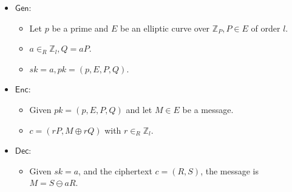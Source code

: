 \documentclass[11pt]{article}
\theoremstyle{definition}
\theoremstyle{proof}
\newcommand{\Gen}{\mathsf{Gen}}
\newcommand{\Enc}{\mathsf{Enc}}
\newcommand{\Dec}{\mathsf{Dec}}
\begin{document}
\begin{itemize}
	\item $\Gen$:
	\begin{itemize}
		\item Let $p$ be a prime and $E$ be an elliptic curve over $\mathbb{Z}_P, P \in E$ of order $l$.
		\item $a \in_R \mathbb{Z}_l, Q = aP$.
		\item $sk = a, pk = (p, E, P, Q)$.
	\end{itemize}
	\item $\Enc$:
	\begin{itemize}
		\item Given $pk = (p, E, P, Q)$ and let $M \in E$ be a message.
		\item $c = (rP, M \oplus rQ)$ with $r \in_R \mathbb{Z}_l$.
	\end{itemize}
	\item $\Dec$:
	\begin{itemize}
		\item Given $sk = a$, and the ciphertext $c = (R, S)$, the message is $M = S \ominus aR$.
	\end{itemize}
\end{itemize}
\end{document}
